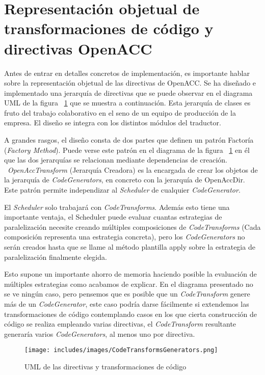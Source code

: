 \section{Representación objetual de transformaciones de código y directivas OpenACC}

Antes de entrar en detalles concretos de implementación, es importante hablar sobre la representación objetual de las directivas de OpenACC.
Se ha diseñado e implementado una jerarquía de directivas que se puede observar en el diagrama UML de la figura ~\ref{fig:TransformsGeneratorsUML} que se muestra a continuación. Esta jerarquía de clases es fruto del trabajo colaborativo en el seno de un equipo de producción de la empresa. El diseño se integra con los distintos módulos del traductor.

A grandes rasgos, el diseño consta de dos partes que definen un patrón Factoría (\textit{Factory Method}). Puede verse este patrón en el diagrama de la figura ~\ref{fig:TransformsGeneratorsUML} en él que las dos jerarquías se relacionan mediante dependencias de creación. ~\textit{OpenAccTransform} (Jerarquía Creadora) es la encargada de crear los objetos de la jerarquía de \textit{CodeGenerators}, en concreto con la jerarquía de OpenAccDir. Este patrón permite independizar al \textit{Scheduler} de cualquier \textit{CodeGenerator}.

El \textit{Scheduler} solo trabajará con \textit{CodeTransforms}. Además esto tiene una importante ventaja, el Scheduler puede evaluar cuantas estrategias de paralelización necesite creando múltiples composiciones de \textit{CodeTransforms} (Cada composición representa una estrategia concreta), pero los \textit{CodeGenerators} no serán creados hasta que se llame al método plantilla apply sobre la estrategia de paralelización finalmente elegida.

Esto supone un importante ahorro de memoria haciendo posible la evaluación de múltiples estrategias como acabamos de explicar. En el diagrama presentado no se ve ningún caso, pero pensemos que es posible que un \textit{CodeTransform} genere más de un \textit{CodeGenerator}, este caso podría darse fácilmente si extendemos las transformaciones de código contemplando casos en los que cierta construcción de código se realiza empleando varias directivas, el \textit{CodeTransform} resultante generaría varios \textit{CodeGenerators}, al menos uno por directiva.


\begin{landscape}
\begin{figure}[t]
\texttt{[image: includes/images/CodeTransformsGenerators.png]}
\thispagestyle{empty}
\caption{UML de las directivas y transformaciones de código}
\label{fig:TransformsGeneratorsUML}
\end{figure}
\end{landscape}

